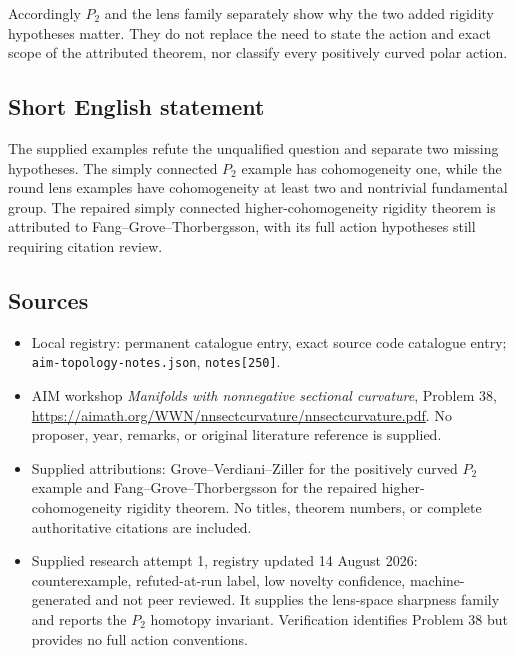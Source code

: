 \documentclass[11pt]{article}
\begin{document}
Accordingly $P_2$ and the lens family separately show why the two added rigidity hypotheses matter. They do not replace the need to state the action and exact scope of the attributed theorem, nor classify every positively curved polar action.
\subsection{Short English statement}
The supplied examples refute the unqualified question and separate two missing hypotheses. The simply connected $P_2$ example has cohomogeneity one, while the round lens examples have cohomogeneity at least two and nontrivial fundamental group. The repaired simply connected higher-cohomogeneity rigidity theorem is attributed to Fang--Grove--Thorbergsson, with its full action hypotheses still requiring citation review.
\subsection{Sources}
\begin{itemize}
\item Local registry: permanent catalogue entry, exact source code catalogue entry; \texttt{aim-topology-notes.json}, \texttt{notes[250]}.
\item AIM workshop \emph{Manifolds with nonnegative sectional curvature}, Problem 38, \url{https://aimath.org/WWN/nnsectcurvature/nnsectcurvature.pdf}. No proposer, year, remarks, or original literature reference is supplied.
\item Supplied attributions: Grove--Verdiani--Ziller for the positively curved $P_2$ example and Fang--Grove--Thorbergsson for the repaired higher-cohomogeneity rigidity theorem. No titles, theorem numbers, or complete authoritative citations are included.
\item Supplied research attempt 1, registry updated 14 August 2026: counterexample, refuted-at-run label, low novelty confidence, machine-generated and not peer reviewed. It supplies the lens-space sharpness family and reports the $P_2$ homotopy invariant. Verification identifies Problem 38 but provides no full action conventions.
\end{itemize}
\end{document}
